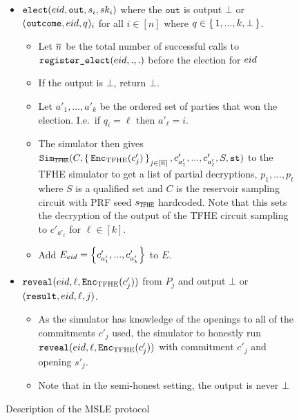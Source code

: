 \begin{figure}
{\begin{minipage}{1\textwidth}
\begin{itemize}

				\item $\texttt{elect}({eid}, \texttt{out}, s_i, sk_i)$ where the $\texttt{out}$ is output $\bot$ or $(\texttt{outcome}, {eid}, q)_i$ for all $i \in [n]$ where $q \in \set{1, ..., k, \bot}$.
				      \begin{itemize}
					      \item Let $\overline{n}$ be the total number of successful calls to $\texttt{register\_elect}({eid}, ., .)$ before the election for ${eid}$
					      \item If the output is $\bot$, return $\bot$.
					      \item Let $a'_1, ..., a'_k$ be the ordered set of parties that won the election. I.e.\ if $q_i = \ell$ then $a'_\ell = i$.
					      \item The simulator then gives $\texttt{Sim}_{{\texttt{TFHE}}}(C, \set{\texttt{Enc}_{\mathrm{TFHE}}(c'_j)}_{j \in [\overline{n}]}, c'_{a'_1}, ..., c'_{a'_\ell}, S, \texttt{st})$
					            to the TFHE simulator to get a list of partial decryptions, $p_1, ..., p_{t}$ where $S$ is a qualified set %
					            and $C$ is the reservoir sampling circuit with PRF seed $s_{\texttt{TFHE}}$ hardcoded.
					            Note that this sets the decryption of the output of the TFHE circuit sampling to $c'_{a'_\ell}$ for $\ell \in [k]$.
					      \item Add $E_{eid} = \left\{c'_{a'_1}, ..., c'_{a'_k}\right\}$ to $E$.
				      \end{itemize}
				\item $\texttt{reveal}({eid}, \ell, \texttt{Enc}_{\mathrm{TFHE}}(c'_j))$ from $P_j$ and output $\bot$ or $(\texttt{result}, {eid}, \ell, j)$.
				      \begin{itemize}
					      \item As the simulator has knowledge of the openings to all of the commitments $c'_j$ used, the simulator
					            to honestly run $\texttt{reveal}({eid}, \ell, \texttt{Enc}_{\mathrm{TFHE}}(c'_j))$ with commitment $c'_j$ and opening $s'_j$.
					      \item Note that in the semi-honest setting, the output is never $\bot$
				      \end{itemize}
			\end{itemize}
		\end{minipage}
	}
	\caption{Description of the MSLE protocol}
	\label{fig:protocolMSLE}
\end{figure}

